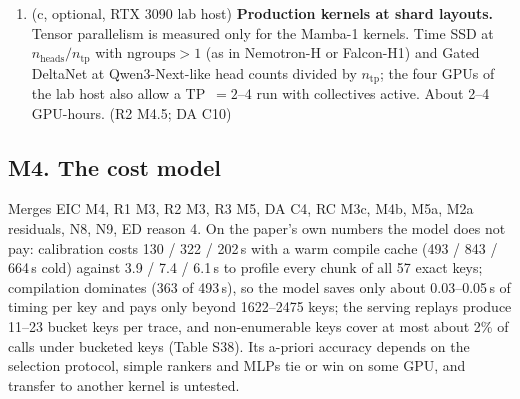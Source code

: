 \documentclass[11pt]{article}
\begin{document}
\begin{enumerate}[label=M3\alph*.]
        code generation on sm\_120 and sm\_86 may differ from sm\_90/sm\_100
        for these matrix-product-heavy pipelines, and scope every
        production-kernel claim to ``an Ampere consumer GPU and a Blackwell
        server GPU''. (EIC M1 fix (a); R2 M5; R3 M3.1; DA C10; RC M6a)
  \item (c, optional, RTX 3090 lab host) \textbf{Production kernels at shard
        layouts.} Tensor parallelism is measured only for the Mamba-1
        kernels. Time SSD at $n_{\mathrm{heads}}/n_{\mathrm{tp}}$ with
        $\mathrm{ngroups}>1$ (as in Nemotron-H or Falcon-H1) and Gated
        DeltaNet at Qwen3-Next-like head counts divided by $n_{\mathrm{tp}}$;
        the four GPUs of the lab host also allow a TP~$=2$--4 run with
        collectives active. About 2--4 GPU-hours. (R2 M4.5; DA C10)
\end{enumerate}

\subsection*{M4. The cost model}
Merges EIC M4, R1 M3, R2 M3, R3 M5, DA C4, RC M3c, M4b, M5a, M2a residuals,
N8, N9, ED reason 4. On the paper's own numbers the model does not pay:
calibration costs 130 / 322 / 202\,s with a warm compile cache (493 / 843 /
664\,s cold) against 3.9 / 7.4 / 6.1\,s to profile every chunk of all 57 exact
keys; compilation dominates (363 of 493\,s), so the model saves only about
0.03--0.05\,s of timing per key and pays only beyond 1622--2475 keys; the
serving replays produce 11--23 bucket keys per trace, and non-enumerable keys
cover at most about 2\% of calls under bucketed keys (Table S38). Its
a-priori accuracy depends on the selection protocol, simple rankers and MLPs
tie or win on some GPU, and transfer to another kernel is untested.
\end{document}
